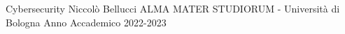 \documentclass[tikz]{report}
\begin{document}
\frontpage
{Cybersecurity}
{}
{Niccolò Bellucci}
{ALMA MATER STUDIORUM - Università di Bologna}
{Anno Accademico 2022-2023}

%

\thispagestyle{empty}
%
\tableofcontents








\end{document}
